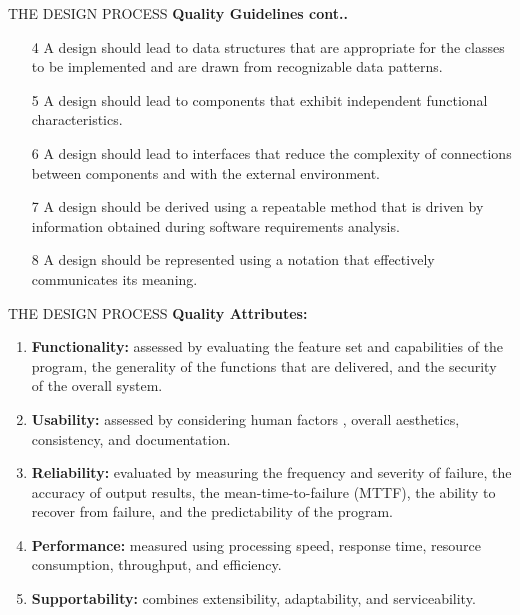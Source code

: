 \documentclass{beamer}
\begin{document}
\begin{frame}{THE DESIGN PROCESS}
	\textbf{Quality Guidelines cont..}
	\begin{itemize}
		\item[4] A design should lead to data structures that are appropriate for the classes to be implemented 
		and are drawn from recognizable data patterns. 
		\item[5] A design should lead to components that exhibit independent functional characteristics.
		\item[6] A design should lead to interfaces that reduce the complexity of connections between 
		components and with the external environment.
		\item[7] A design should be derived using a repeatable method that is driven by information obtained 
		during software requirements analysis.
		\item[8] A design should be represented using a notation that effectively communicates its meaning.
	\end{itemize}
\end{frame}
\begin{frame}{THE DESIGN PROCESS}
	\textbf{Quality Attributes:}
	\begin{enumerate}
		\item \textbf{Functionality:}  assessed by evaluating the feature set and capabilities of  the program, the generality of the functions that are delivered, and the  security of the overall system.
		\item \textbf{Usability:} assessed by considering human factors , overall aesthetics,
		consistency, and documentation.
		\item \textbf{Reliability:} evaluated by measuring the frequency and severity of failure,  the accuracy of output results, the mean-time-to-failure (MTTF), the ability  to recover from failure, and the predictability of the program.
		\item \textbf{Performance:} measured using processing speed, response time, resource  consumption, throughput, and efficiency.
		\item \textbf{Supportability:} combines extensibility, adaptability, and serviceability.
		
	\end{enumerate}
\end{frame}
\end{document}

